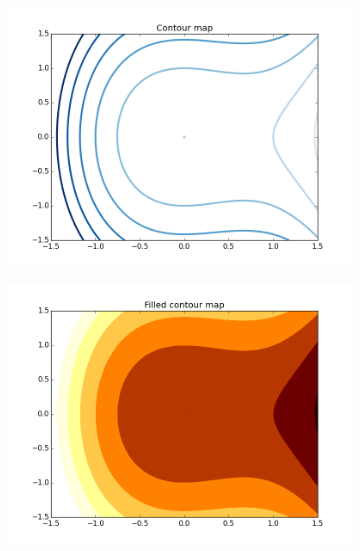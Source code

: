 \begin{figure}[H]
\centering
\begin{subfigure}{.45\textwidth}
\centering
\includegraphics[width=\textwidth]{contour_map.png}
\end{subfigure}
\begin{subfigure}{.45\textwidth}
\centering
\includegraphics[width=\textwidth]{contour_map_filled.png}
\end{subfigure}
\begin{subfigure}{.45\textwidth}
\centering

\end{subfigure}
\end{figure}
